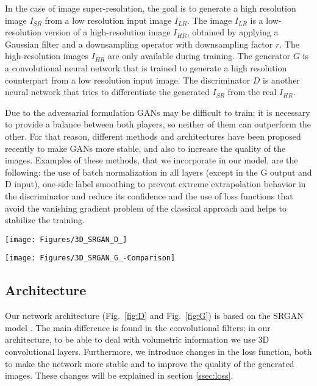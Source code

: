 \documentclass{article}
\begin{document}
In the case of image super-resolution, the goal is to generate a high resolution image $I_{SR}$ from a low resolution input image $I_{LR}$. The image $I_{LR}$ is a low-resolution version of a high-resolution image $I_{HR}$, obtained by applying a Gaussian filter and a downsampling operator with downsampling factor $r$. The high-resolution images $I_{HR}$ are only available during training.
The generator $G$ is a convolutional neural network that is trained to generate a high resolution counterpart from a low resolution input image. The discriminator $D$ is another neural network that tries to differentiate the generated $I_{SR}$ from the real $I_{HR}$.

Due to the adversarial formulation GANs may be difficult to train; it is necessary to provide a balance between both players, so neither of them can outperform the other.
For that reason, different methods and architectures have been proposed recently to make GANs more stable, and also to increase the quality of the images.
Examples of these methods, that we incorporate in our model, are the following:
the use of batch normalization in all layers (except in the G output and D input), one-side label smoothing to prevent extreme extrapolation behavior in the discriminator and reduce its confidence and the use of loss functions that avoid the vanishing gradient problem of the classical approach and helps to stabilize the training.

\begin{figure*}
  \texttt{[image: Figures/3D\_SRGAN\_D\_]}
  \caption{Architecture of the Discriminator network. For each convolutional layer: kernel size (3x3x3), number of filters, stride (s).}
  \label{fig:D}
\end{figure*}
\begin{figure*}
   \texttt{[image: Figures/3D\_SRGAN\_G\_-Comparison]}
   \caption{Architecture of the Generator network. For each convolutional layer: kernel size (3x3x3), number of filters, stride (s).}
	\label{fig:G}
\end{figure*}

\subsection{Architecture}
\label{ssec:arch}

Our network architecture (Fig.~\ref{fig:D} and Fig.~\ref{fig:G}) is based on the SRGAN model \cite{ledig:srgan}. The main difference is found in the convolutional filters; in our architecture, to be able to deal with volumetric information we use 3D convolutional layers. Furthermore, we introduce changes in the loss function, both to make the network more stable and to improve the quality of the generated images. These changes will be explained in section \ref{ssec:loss}.
\end{document}
